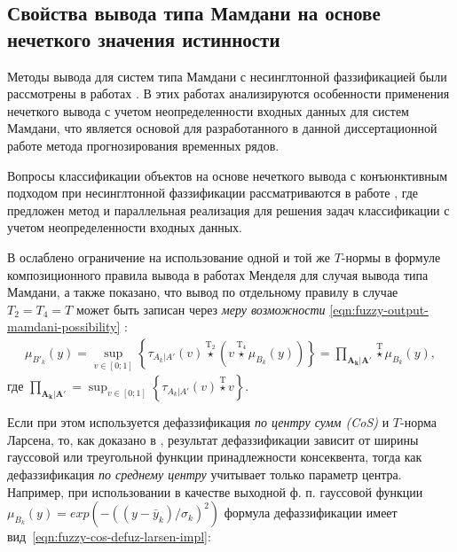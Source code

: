 
\subsection{Свойства вывода типа Мамдани на основе нечеткого значения истинности}

Методы вывода для систем типа Мамдани с несинглтонной фаззификацией были рассмотрены в работах \cite{Sinuk2022, Sinuk2023kii}. В этих работах анализируются особенности применения нечеткого вывода с учетом неопределенности входных данных для систем Мамдани, что является основой для разработанного в данной диссертационной работе метода прогнозирования временных рядов.

Вопросы классификации объектов на основе нечеткого вывода с конъюнктивным подходом при несинглтонной фаззификации рассматриваются в работе \cite{Karatach2022}, где предложен метод и параллельная реализация для решения задач классификации с учетом неопределенности входных данных.

В \cite{Sinuk2023} ослаблено ограничение на использование одной и той же $T$-нормы в формуле композиционного правила вывода в работах Менделя для случая вывода типа Мамдани, а также показано, что вывод по отдельному правилу в случае $T_2 = T_4 = T$ может быть записан через \textit{меру возможности} \eqref{eqn:fuzzy-output-mamdani-possibility} \cite{DuboisPrade1980FuzzySetsSystems}:
\begin{align}
	\label{eqn:fuzzy-output-mamdani-possibility}
	\mu_{B'_k}(y) = \sup_{v\in[0;1]}\left\{\tau_{A_{k}|A'}(v) \overset{\mathrm{T_2}}{\star} (v \overset{\mathrm{T_4}}{\star} \mu_{B_k}(y)) \right\} = \textstyle\prod_{\mathbf{A_k}|\mathbf{A'}} \overset{\mathrm{T}}{\star} \mu_{B_k}(y),
\end{align}
где $\prod_{\mathbf{A_k}|\mathbf{A'}}=\sup_{v\in[0;1]}\left\{\tau_{A_{k}|A'}(v) \overset{\mathrm{T}}{\star} v\right\}$.

Если при этом используется дефаззификация \textit{по центру сумм (CoS)} и $T$-норма Ларсена, то, как доказано в \cite{Sinuk2023}, результат дефаззификации зависит от ширины гауссовой или треугольной функции принадлежности консеквента, тогда как дефаззификация \textit{по среднему центру} учитывает только параметр центра. Например, при использовании в качестве выходной ф. п. гауссовой функции $\mu_{B_k}(y) = exp(-((y-\bar{y}_k)/\sigma_k)^2)$ формула дефаззификации имеет вид~\eqref{eqn:fuzzy-cos-defuz-larsen-impl}: 

